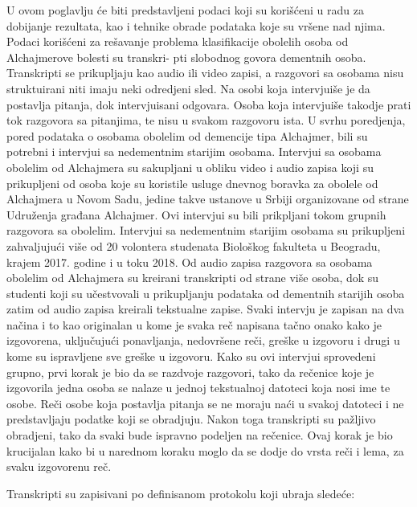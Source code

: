 \documentclass[12pt,oneside]{memoir}
\begin{document}
U ovom poglavlju će biti predstavljeni podaci koji su korišćeni u radu za dobijanje rezultata,  kao i tehnike obrade podataka koje su vršene nad njima.  Podaci korišćeni za rešavanje problema klasifikacije obolelih osoba od Alchajmerove bolesti su transkri-
pti slobodnog govora dementnih osoba. Transkripti se prikupljaju kao audio ili video zapisi,  a razgovori sa osobama nisu struktuirani niti imaju neki odredjeni sled.  Na osobi koja intervjuiše je da postavlja pitanja,  dok intervjuisani odgovara.  Osoba koja intervjuiše takodje prati tok razgovora sa pitanjima,  te nisu u svakom razgovoru ista.  
U svrhu poredjenja, pored podataka o osobama obolelim od demencije tipa Alchajmer,  bili su potrebni i intervjui sa nedementnim starijim osobama. Intervjui sa osobama obolelim od Alchajmera su sakupljani u obliku video i audio zapisa koji su prikupljeni od osoba koje su koristile usluge dnevnog boravka za obolele od Alchajmera u Novom Sadu,  jedine takve ustanove u Srbiji organizovane od strane Udruženja građana Alchajmer.  Ovi intervjui su bili prikpljani tokom grupnih razgovora sa obolelim.  Intervjui sa nedementnim starijim osobama su prikupljeni zahvaljujući više od 20 volontera studenata Biološkog fakulteta u Beogradu,  krajem 2017. godine i u toku 2018.
Od audio zapisa razgovora sa osobama obolelim od Alchajmera su kreirani transkripti od strane više osoba,  dok su studenti koji su učestvovali u prikupljanju podataka od dementnih starijih osoba zatim od audio zapisa kreirali tekstualne zapise.  Svaki intervju je zapisan na dva načina i to kao originalan u kome je svaka reč napisana tačno onako kako je izgovorena,  uključujući ponavljanja,  nedovršene reči,  greške u izgovoru i drugi u kome su ispravljene sve greške u izgovoru.  Kako su ovi intervjui sprovedeni grupno,  prvi korak je bio da se razdvoje razgovori,  tako da rečenice koje je izgovorila jedna osoba se nalaze u jednoj tekstualnoj datoteci koja nosi ime te osobe.
Reči osobe koja postavlja pitanja se ne moraju naći u svakoj datoteci i ne predstavljaju podatke koji se obradjuju.  Nakon toga transkripti su pažljivo obradjeni,  tako da svaki bude ispravno podeljen na rečenice.  Ovaj korak je bio krucijalan kako bi u narednom koraku moglo da se dodje do vrsta reči i lema,  za svaku izgovorenu reč.  

Transkripti su zapisivani po definisanom protokolu koji ubraja sledeće:
\end{document}
